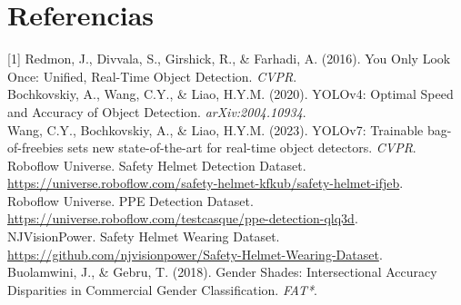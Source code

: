 \documentclass{article}
\begin{document}
\section*{Referencias}
{\small
[1] Redmon, J., Divvala, S., Girshick, R., \& Farhadi, A. (2016). You Only Look Once: Unified, Real-Time Object Detection. \textit{CVPR}.\\
[2] Bochkovskiy, A., Wang, C.Y., \& Liao, H.Y.M. (2020). YOLOv4: Optimal Speed and Accuracy of Object Detection. \textit{arXiv:2004.10934}.\\
[3] Wang, C.Y., Bochkovskiy, A., \& Liao, H.Y.M. (2023). YOLOv7: Trainable bag-of-freebies sets new state-of-the-art for real-time object detectors. \textit{CVPR}.\\
[4] Roboflow Universe. Safety Helmet Detection Dataset. \url{https://universe.roboflow.com/safety-helmet-kfkub/safety-helmet-ifjeb}.\\
[5] Roboflow Universe. PPE Detection Dataset. \url{https://universe.roboflow.com/testcasque/ppe-detection-qlq3d}.\\
[6] NJVisionPower. Safety Helmet Wearing Dataset. \url{https://github.com/njvisionpower/Safety-Helmet-Wearing-Dataset}.\\
[7] Buolamwini, J., \& Gebru, T. (2018). Gender Shades: Intersectional Accuracy Disparities in Commercial Gender Classification. \textit{FAT*}.\\
}
\end{document}
